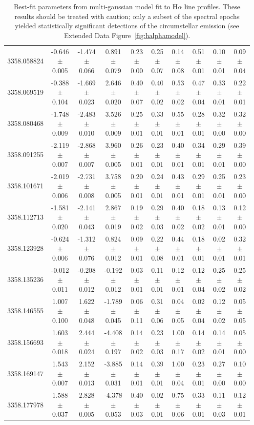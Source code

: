 \documentclass{nature3}
\begin{document}
\begin{methods}
\begin{table}
\begin{tabular}{lccccccccc}
  3358.058824 & -0.646 $\pm$ 0.005 & -1.474 $\pm$ 0.066 & 0.891 $\pm$ 0.079 & 0.23 $\pm$ 0.00 & 0.25 $\pm$ 0.07 & 0.14 $\pm$ 0.08 & 0.51 $\pm$ 0.01 & 0.10 $\pm$ 0.01 & 0.09 $\pm$ 0.04 \\
  3358.069519 & -0.388 $\pm$ 0.104 & -1.669 $\pm$ 0.023 & 2.646 $\pm$ 0.020 & 0.40 $\pm$ 0.07 & 0.40 $\pm$ 0.02 & 0.53 $\pm$ 0.02 & 0.47 $\pm$ 0.04 & 0.33 $\pm$ 0.01 & 0.22 $\pm$ 0.01 \\
  3358.080468 & -1.748 $\pm$ 0.009 & -2.483 $\pm$ 0.010 & 3.526 $\pm$ 0.009 & 0.25 $\pm$ 0.01 & 0.33 $\pm$ 0.01 & 0.55 $\pm$ 0.01 & 0.28 $\pm$ 0.01 & 0.32 $\pm$ 0.00 & 0.32 $\pm$ 0.00 \\
  3358.091255 & -2.119 $\pm$ 0.007 & -2.868 $\pm$ 0.007 & 3.960 $\pm$ 0.005 & 0.26 $\pm$ 0.01 & 0.23 $\pm$ 0.01 & 0.40 $\pm$ 0.01 & 0.34 $\pm$ 0.01 & 0.29 $\pm$ 0.01 & 0.39 $\pm$ 0.00 \\
  3358.101671 & -2.019 $\pm$ 0.006 & -2.731 $\pm$ 0.008 & 3.758 $\pm$ 0.005 & 0.20 $\pm$ 0.01 & 0.24 $\pm$ 0.01 & 0.43 $\pm$ 0.01 & 0.29 $\pm$ 0.01 & 0.25 $\pm$ 0.01 & 0.23 $\pm$ 0.00 \\
  3358.112713 & -1.581 $\pm$ 0.020 & -2.141 $\pm$ 0.043 & 2.867 $\pm$ 0.019 & 0.19 $\pm$ 0.02 & 0.29 $\pm$ 0.03 & 0.40 $\pm$ 0.02 & 0.18 $\pm$ 0.02 & 0.13 $\pm$ 0.01 & 0.12 $\pm$ 0.00 \\
  3358.123928 & -0.624 $\pm$ 0.006 & -1.312 $\pm$ 0.076 & 0.824 $\pm$ 0.012 & 0.09 $\pm$ 0.01 & 0.22 $\pm$ 0.08 & 0.44 $\pm$ 0.01 & 0.18 $\pm$ 0.01 & 0.02 $\pm$ 0.01 & 0.32 $\pm$ 0.01 \\
  3358.135236 & -0.012 $\pm$ 0.011 & -0.208 $\pm$ 0.012 & -0.192 $\pm$ 0.012 & 0.03 $\pm$ 0.01 & 0.11 $\pm$ 0.01 & 0.12 $\pm$ 0.01 & 0.12 $\pm$ 0.04 & 0.25 $\pm$ 0.02 & 0.25 $\pm$ 0.02 \\
  3358.146555 & 1.007 $\pm$ 0.100 & 1.622 $\pm$ 0.048 & -1.789 $\pm$ 0.045 & 0.06 $\pm$ 0.11 & 0.31 $\pm$ 0.06 & 0.04 $\pm$ 0.05 & 0.02 $\pm$ 0.04 & 0.12 $\pm$ 0.02 & 0.05 $\pm$ 0.05 \\
  3358.156693 & 1.603 $\pm$ 0.018 & 2.444 $\pm$ 0.024 & -4.408 $\pm$ 0.197 & 0.14 $\pm$ 0.02 & 0.23 $\pm$ 0.03 & 1.00 $\pm$ 0.17 & 0.14 $\pm$ 0.02 & 0.14 $\pm$ 0.01 & 0.05 $\pm$ 0.00 \\
  3358.169147 & 1.543 $\pm$ 0.007 & 2.152 $\pm$ 0.013 & -3.885 $\pm$ 0.031 & 0.14 $\pm$ 0.01 & 0.39 $\pm$ 0.01 & 1.00 $\pm$ 0.04 & 0.23 $\pm$ 0.01 & 0.27 $\pm$ 0.00 & 0.10 $\pm$ 0.00 \\
  3358.177978 & 1.588 $\pm$ 0.037 & 2.828 $\pm$ 0.005 & -4.378 $\pm$ 0.053 & 0.40 $\pm$ 0.03 & 0.02 $\pm$ 0.01 & 0.75 $\pm$ 0.06 & 0.33 $\pm$ 0.01 & 0.11 $\pm$ 0.03 & 0.12 $\pm$ 0.01 \\
  \hline
  \end{tabular}
  \caption{Best-fit parameters from multi-gaussian model fit to H$\alpha$ line
  profiles.  These results should be treated with caution; only a
  subset of the spectral epochs yielded statistically significant
  detections of the circumstellar emission (see Extended Data
  Figure~\ref{fig:halphamodel}).}
  \label{tab:halphamodelparams}
\end{table}



\end{methods}
\end{document}
